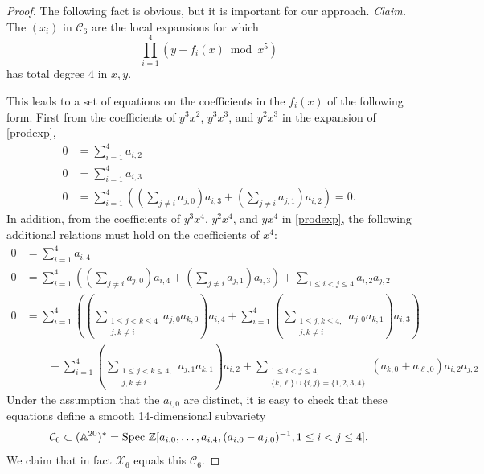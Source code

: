 \documentclass[12pt]{amsart}
\theoremstyle{theorem}
\newcommand{\ZZ}{\mathbb{Z}}
\newcommand{\A}{\mathbb{A}}
\begin{document}
\begin{proof}
The following fact is obvious, but it is important for our approach.
\vskip 10pt
\noindent
{\it Claim.}
The $(x_i)$ in $\mathcal{C}_6$ are the local expansions 
for which
\begin{equation}
\label{prodexp}
\prod_{i=1}^4 (y - f_i(x) \bmod x^5)
\end{equation}
has total degree $4$ in $x,y$.

\vskip 10pt
This leads to a set of equations on the coefficients in the $f_i(x)$ of the following form.  First from the coefficients of $y^3 x^2$, $y^3 x^3$, and $y^2 x^3$ in
the expansion of \eqref{prodexp},
\begin{align}
\label{Reiss4a}
0 &= \sum_{i=1}^4 a_{i,2} \nonumber \\
0 &= \sum_{i=1}^4 a_{i,3}  \\
0 &=\sum_{i=1}^4 \left(\left(\sum_{j \ne i} a_{j,0}\right) a_{i,3} + \left(\sum_{j\ne i} a_{j,1}\right) a_{i,2}\right) = 0. \nonumber
\end{align}
 In addition, from the coefficients of $y^3 x^4$, $y^2 x^4$, and $y x^4$ in \eqref{prodexp}, the following additional relations must hold on the coefficients of $x^4$:
\begin{align}
\label{Reiss4b}
0 &= \sum_{i=1}^4 a_{i,4} \nonumber \\
0 &= \sum_{i=1}^4 \left( \left(\sum_{j \ne i} a_{j,0}\right) a_{i,4} + \left(\sum_{j\ne i} a_{j,1}\right) a_{i,3} \right) + \sum_{1 \le i < j \le 4} a_{i,2} a_{j,2}  \\
0 &=\sum_{i=1}^4 \left(\left(\sum_{\substack{1 \le j < k \le 4\\  j,k \ne i}} a_{j,0} a_{k,0}\right) a_{i,4} + \sum_{i=1}^4 \left(\sum_{\substack{1 \le j,  k \le 4,\\  j,k \ne i}} a_{j,0} a_{k,1}\right) a_{i,3} \right) \nonumber\\ 
&\qquad + \sum_{i=1}^4 \left(\sum_{\substack{1 \le j < k \le 4,\\ j,k \ne i}} a_{j,1} a_{k,1} \right) a_{i,2} + \sum_{\substack{1 \le i < j \le 4,\\ \{k,\ell\} \cup \{i,j\} = \{1,2,3,4\} }} (a_{k,0} + a_{\ell,0}) a_{i,2} a_{j,2} \nonumber
\end{align}
Under the assumption that the $a_{i,0}$ are distinct, it is easy to check
that these equations define a smooth 14-dimensional subvariety 
$$\mathcal{C}_6 \subset (\A^{20})^* = {\rm Spec}\ \ZZ[a_{i,0}, \ldots, a_{i,4},  (a_{i,0} - a_{j,0})^{-1}, 1 \le i < j \le 4].$$  
We claim that in fact $\mathcal{X}_6$ equals this $\mathcal{C}_6$. 


\end{proof}
\end{document}
